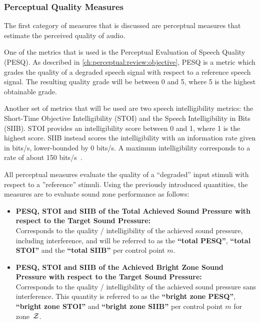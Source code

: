 \subsubsection{Perceptual Quality Measures}
The first category of measures that is discussed are perceptual measures that estimate the perceived 
quality of audio.

One of the metrics that is used is the Perceptual Evaluation of Speech Quality (PESQ).
As described in \autoref{ch:perceptual:review:objective}, PESQ is a metric which grades the quality of a 
degraded speech signal with respect to a reference speech signal.
The resulting quality grade will be between 0 and 5, where 5 is the highest obtainable grade.

Another set of metrics that will be used are two speech intelligibility metrics: 
the Short-Time Objective Intelligibility (STOI) and 
the Speech Intelligibility in Bits (SIIB).
STOI provides an intelligibility score between 0 and 1, where 1 is the highest score.
SIIB instead scores the intelligibility with an information rate given in bits/s, lower-bounded by 0 bits/s.
A maximum intelligibility corresponds to a rate of about 150 bits/s~\cite{van2017instrumental}.

All perceptual measures evaluate the quality of a ``degraded'' input stimuli with respect to a ''reference'' stimuli.
Using the previously introduced quantities, the measures are to evaluate sound zone performance as follows:
\begin{itemize}
    \item \textbf{PESQ, STOI and SIIB of the Total Achieved Sound Pressure with 
        respect to the Target Sound Pressure:}\\
        Corresponds to the quality / intelligibility of the achieved sound pressure,
        including interference, and will be referred 
        to as the \textbf{``total PESQ''}, \textbf{``total STOI''} and the \textbf{``total SIIB''} per control point $m$. 
    \item \textbf{PESQ, STOI and SIIB of the Achieved Bright Zone Sound Pressure with 
        respect to the Target Sound Pressure:}\\
        Corresponds to the quality / intelligibility of the achieved sound pressure sans interference.
        This quantity is referred to as the \textbf{``bright zone PESQ''}, \textbf{``bright zone STOI''} and \textbf{``bright zone SIIB''}
        per control point $m$ for zone~$\mathcal{Z}$.
\end{itemize}

